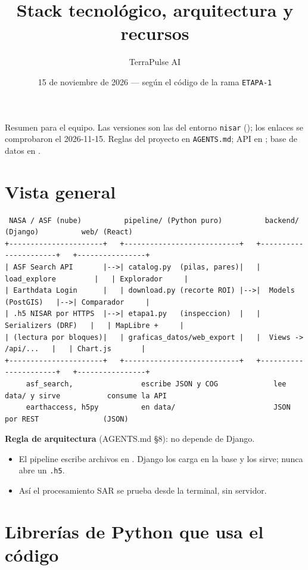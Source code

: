 \documentclass[11pt,a4paper]{article}
\title{Stack tecnológico, arquitectura y recursos}
\author{TerraPulse AI}
\date{15 de noviembre de 2026 --- según el código de la rama \texttt{ETAPA-1}}
\begin{document}
\maketitle

Resumen para el equipo. Las versiones son las del entorno \texttt{nisar} (); los enlaces se
comprobaron el 2026-11-15. Reglas del proyecto en \texttt{AGENTS.md}; API en ; base de datos en
.

\tableofcontents

\section{Vista general}

\begin{lstlisting}
 NASA / ASF (nube)          pipeline/ (Python puro)          backend/ (Django)          web/ (React)
+----------------------+   +---------------------------+   +----------------------+   +----------------+
| ASF Search API       |-->| catalog.py  (pilas, pares)|   | load_explore         |   | Explorador     |
| Earthdata Login      |   | download.py (recorte ROI) |-->|  Models  (PostGIS)   |-->| Comparador     |
| .h5 NISAR por HTTPS  |-->| etapa1.py   (inspeccion)  |   |  Serializers (DRF)   |   | MapLibre +     |
| (lectura por bloques)|   | graficas_datos/web_export |   |  Views -> /api/...   |   | Chart.js       |
+----------------------+   +---------------------------+   +----------------------+   +----------------+
     asf_search,                escribe JSON y COG             lee data/ y sirve           consume la API
     earthaccess, h5py          en data/                       JSON por REST               (JSON)
\end{lstlisting}

\textbf{Regla de arquitectura} (AGENTS.md §8):  no depende de Django.
\begin{itemize}
  \item El pipeline escribe archivos en . Django los carga en la base y los sirve; nunca abre un \texttt{.h5}.
  \item Así el procesamiento SAR se prueba desde la terminal, sin servidor.
\end{itemize}

\section{Librerías de Python que usa el código}
\end{document}
